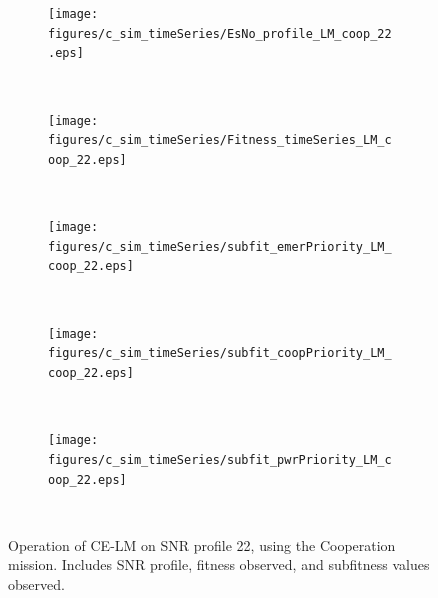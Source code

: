 \begin{figure}[ht!]
\centering
\begin{subfigure}{\linewidth}
	\centering
	\texttt{[image: figures/c\_sim\_timeSeries/EsNo\_profile\_LM\_coop\_22.eps]}
\end{subfigure}\\
\begin{subfigure}{\linewidth}
	\centering
	\texttt{[image: figures/c\_sim\_timeSeries/Fitness\_timeSeries\_LM\_coop\_22.eps]}
\end{subfigure}\\
\begin{subfigure}{\linewidth}
	\centering
	\texttt{[image: figures/c\_sim\_timeSeries/subfit\_emerPriority\_LM\_coop\_22.eps]}
\end{subfigure}\\
\begin{subfigure}{\linewidth}
	\centering
	\texttt{[image: figures/c\_sim\_timeSeries/subfit\_coopPriority\_LM\_coop\_22.eps]}
\end{subfigure}\\
\begin{subfigure}{\linewidth}
	\centering
	\texttt{[image: figures/c\_sim\_timeSeries/subfit\_pwrPriority\_LM\_coop\_22.eps]}
\end{subfigure}\\
\caption{Operation of CE-LM on SNR profile 22, using the Cooperation mission. Includes SNR profile, fitness observed, and subfitness values observed.} \label{fig:c22LMCoop}
\end{figure}

